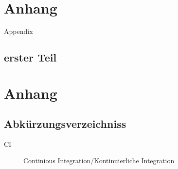 \appendix
\chapter{Anhang}
Appendix
\section{erster Teil}
\chapter{Anhang}
\section{Abk\"urzungsverzeichniss}
\begin{description}
  \item[CI] Continious Integration/Kontinuierliche Integration
\end{description}
